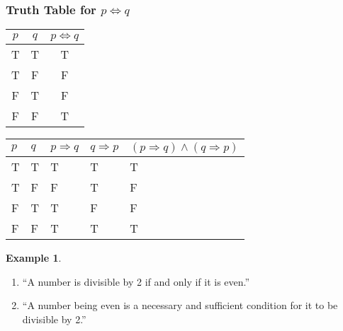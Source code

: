 \documentclass[
]{book}
\providecommand{\tightlist}{%
  \setlength{\itemsep}{0pt}\setlength{\parskip}{0pt}}
\theoremstyle{definition}
\theoremstyle{definition}
\newtheorem{example}{Example}[chapter]
\theoremstyle{definition}
\theoremstyle{definition}
\theoremstyle{remark}
\begin{document}
\subsubsection{\texorpdfstring{Truth Table for \(p \iff q\)}{Truth Table for p \textbackslash iff q}}\label{truth-table-for-p-iff-q}

\begin{longtable}[]{@{}ccc@{}}
\toprule\noalign{}
\(p\) & \(q\) & \(p \iff q\) \\
\midrule\noalign{}
\endhead
\bottomrule\noalign{}
\endlastfoot
T & T & T \\
T & F & F \\
F & T & F \\
F & F & T \\
\end{longtable}

\begin{longtable}[]{@{}
  >{\centering\arraybackslash}p{}
  >{\centering\arraybackslash}p{}
  >{\centering\arraybackslash}p{}
  >{\centering\arraybackslash}p{}
  >{\centering\arraybackslash}p{}@{}}
\toprule\noalign{}
\begin{minipage}[b]{\linewidth}\centering
\(p\)
\end{minipage} & \begin{minipage}[b]{\linewidth}\centering
\(q\)
\end{minipage} & \begin{minipage}[b]{\linewidth}\centering
\(p \Rightarrow q\)
\end{minipage} & \begin{minipage}[b]{\linewidth}\centering
\(q \Rightarrow p\)
\end{minipage} & \begin{minipage}[b]{\linewidth}\centering
\((p \Rightarrow q) \land (q \Rightarrow p)\)
\end{minipage} \\
\midrule\noalign{}
\endhead
\bottomrule\noalign{}
\endlastfoot
T & T & T & T & T \\
T & F & F & T & F \\
F & T & T & F & F \\
F & F & T & T & T \\
\end{longtable}

\begin{example}
\protect\hypertarget{exm:unnamed-chunk-28}{}\label{exm:unnamed-chunk-28}\leavevmode

\begin{enumerate}
\def\labelenumi{\arabic{enumi}.}
\tightlist
\item
  ``A number is divisible by 2 if and only if it is even.''
\item
  ``A number being even is a necessary and sufficient condition for it to be divisible by 2.''
\end{enumerate}

\end{example}
\end{document}
